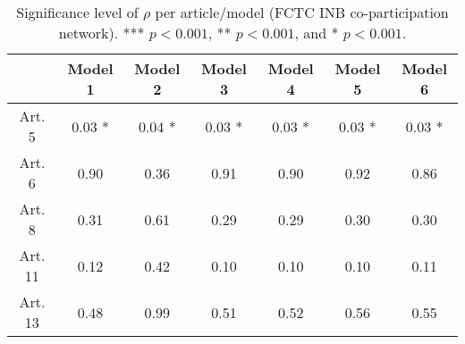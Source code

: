 \begin{table}[ht]
\centering
\begin{tabular}{ccccccc}
  \toprule
 & Model 1 & Model 2 & Model 3 & Model 4 & Model 5 & Model 6 \\ 
  \midrule
Art. 5 & 0.03 * & 0.04 * & 0.03 * & 0.03 * & 0.03 * & 0.03 * \\ 
   \midrule
Art. 6 & 0.90   & 0.36   & 0.91   & 0.90   & 0.92   & 0.86   \\ 
   \midrule
Art. 8 & 0.31   & 0.61   & 0.29   & 0.29   & 0.30   & 0.30   \\ 
   \midrule
Art. 11 & 0.12   & 0.42   & 0.10   & 0.10   & 0.10   & 0.11   \\ 
   \midrule
Art. 13 & 0.48   & 0.99   & 0.51   & 0.52   & 0.56   & 0.55   \\ 
   \bottomrule
\end{tabular}
\caption{Significance level of $\rho$ per article/model (FCTC INB co-participation network). *** $p < 0.001$, ** $p < 0.001$, and * $p < 0.001$.} 
\end{table}
